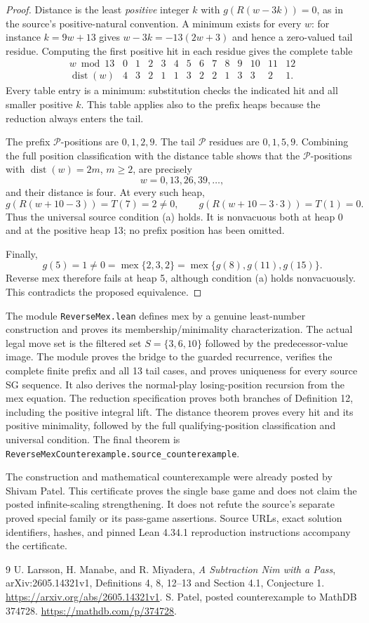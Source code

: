 \documentclass[11pt]{article}
\newcommand{\mex}{\operatorname{mex}}
\newcommand{\dist}{\operatorname{dist}}
\begin{document}
\begin{proof}
Distance is the least \emph{positive} integer $k$ with $g(R(w-3k))=0$, as in the source's positive-natural convention. A minimum exists for every $w$: for instance $k=9w+13$ gives $w-3k=-13(2w+3)$ and hence a zero-valued tail residue. Computing the first positive hit in each residue gives the complete table
\[
\begin{array}{c|rrrrrrrrrrrrr}
w\bmod13&0&1&2&3&4&5&6&7&8&9&10&11&12\\\hline
\dist(w)&4&3&2&1&1&3&2&2&1&3&3&2&1.
\end{array}
\]
Every table entry is a minimum: substitution checks the indicated hit and all smaller positive $k$. This table applies also to the prefix heaps because the reduction always enters the tail.

The prefix $\mathcal P$-positions are $0,1,2,9$. The tail $\mathcal P$ residues are $0,1,5,9$. Combining the full position classification with the distance table shows that the $\mathcal P$-positions with $\dist(w)=2m$, $m\ge2$, are precisely
\[
 w=0,13,26,39,\ldots,
\]
and their distance is four. At every such heap,
\[
 g(R(w+10-3))=T(7)=2\ne0,\qquad
 g(R(w+10-3\cdot3))=T(1)=0.
\]
Thus the universal source condition (a) holds. It is nonvacuous both at heap 0 and at the positive heap 13; no prefix position has been omitted.

Finally,
\[
 g(5)=1\ne0=\mex\{2,3,2\}
   =\mex\{g(8),g(11),g(15)\}.
\]
Reverse mex therefore fails at heap 5, although condition (a) holds nonvacuously. This contradicts the proposed equivalence.
\end{proof}
The module \texttt{ReverseMex.lean} defines mex by a genuine least-number construction and proves its membership/minimality characterization. The actual legal move set is the filtered set $S=\{3,6,10\}$ followed by the predecessor-value image. The module proves the bridge to the guarded recurrence, verifies the complete finite prefix and all 13 tail cases, and proves uniqueness for every source SG sequence. It also derives the normal-play losing-position recursion from the mex equation. The reduction specification proves both branches of Definition 12, including the positive integral lift. The distance theorem proves every hit and its positive minimality, followed by the full qualifying-position classification and universal condition. The final theorem is \texttt{ReverseMexCounterexample.source\_counterexample}.

The construction and mathematical counterexample were already posted by Shivam Patel. This certificate proves the single base game and does not claim the posted infinite-scaling strengthening. It does not refute the source's separate proved special family or its pass-game assertions. Source URLs, exact solution identifiers, hashes, and pinned Lean 4.34.1 reproduction instructions accompany the certificate.
\begin{thebibliography}{9}
 U. Larsson, H. Manabe, and R. Miyadera, \emph{A Subtraction Nim with a Pass}, arXiv:2605.14321v1, Definitions 4, 8, 12--13 and Section 4.1, Conjecture 1. \url{https://arxiv.org/abs/2605.14321v1}.
 S. Patel, posted counterexample to MathDB 374728. \url{https://mathdb.com/p/374728}.
\end{thebibliography}
\end{document}
